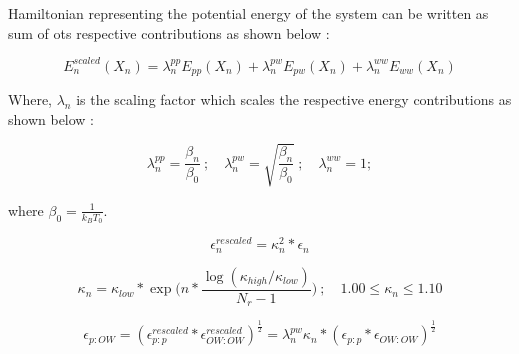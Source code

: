 \documentclass{book}
\begin{document}
Hamiltonian representing the potential energy of the system can be written as sum of ots respective contributions as shown below :

\begin{center}
    \begin{equation}
        E_{n}^{scaled}(X_{n}) = \lambda_{n}^{pp} E_{pp}(X_{n}) + \lambda_{n}^{pw} E_{pw}(X_{n}) + \lambda_{n}^{ww} E_{ww} (X_{n})
    \end{equation}
\end{center}


Where, $\lambda_{n}$ is the scaling factor which scales the respective energy contributions as shown below :  

\begin{center}
    \begin{equation}
        \lambda_{n}^{pp}=\frac{\beta_{n}}{\beta_{0}} \ ; \quad \lambda_{n}^{pw}=\sqrt{\frac{\beta_{n}}{\beta_{0}}} \ ; \quad \lambda_{n}^{ww}=1;        
    \end{equation}
\end{center}

where $\beta_{0}=\frac{1}{k_{B}T_{0}}$.

\begin{center}
    \begin{equation}
        \epsilon_{n}^{rescaled} = \kappa_{n}^{2} * \epsilon_{n}
    \end{equation}
\end{center}

\begin{center}
    \begin{equation}
        \kappa_{n}=\kappa_{low}*\exp{ \biggl(n*\frac{\log(\kappa_{high}/\kappa_{low})}{N_{r}-1}\biggr)} \ ; \quad 1.00 \leq \kappa_{n} \leq 1.10
    \end{equation}
\end{center}

\begin{center}
    \begin{equation}
        \epsilon_{p:OW}=(\epsilon_{p:p}^{rescaled} * \epsilon_{OW:OW}^{rescaled})^{\frac{1}{2}}=\lambda_{n}^{pw}\kappa_{n}*(\epsilon_{p:p} * \epsilon_{OW:OW})^{\frac{1}{2}}
    \end{equation}
\end{center}
\end{document}
